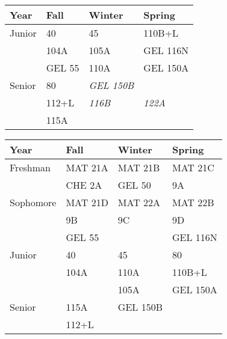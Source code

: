 \documentclass[12pt]{article}
\begin{document}
\begin{center}
\vskip 0.25cm
\begin{center}
\begin{tabular}{|l|l|l|l|}
\hline
Year      & Fall    & Winter & Spring \\
\hline
Junior    & 40         & 45           & 110B+L \\ 
          & 104A       & 105A         & GEL 116N \\ 
          & GEL 55     & 110A         & GEL 150A \\
\hline
Senior   & 80          & {\it GEL 150B} & \\
         & 112+L       & {\it 116B}     & {\it 122A}  \\
         & 115A        &                & \\
\hline
\end{tabular}
\end{center}
\vskip 0.25cm
\begin{tabular}{|l|l|l|l|}
\hline
Year      & Fall    & Winter & Spring \\
\hline
Freshman  & MAT 21A  & MAT 21B  & MAT 21C \\
          & CHE 2A   & GEL 50   & 9A \\
\hline
Sophomore & MAT 21D  & MAT 22A  & MAT 22B \\ 
          & 9B       & 9C       & 9D \\
          & GEL 55   &          & GEL 116N \\
\hline
Junior    & 40       & 45       & 80\\
          & 104A     & 110A     & 110B+L\\
          &          & 105A     & GEL 150A \\         
\hline
Senior   & 115A      & GEL 150B & \\
         & 112+L     &          & \\
\hline 
\end{tabular}

\end{center}
\end{document}
